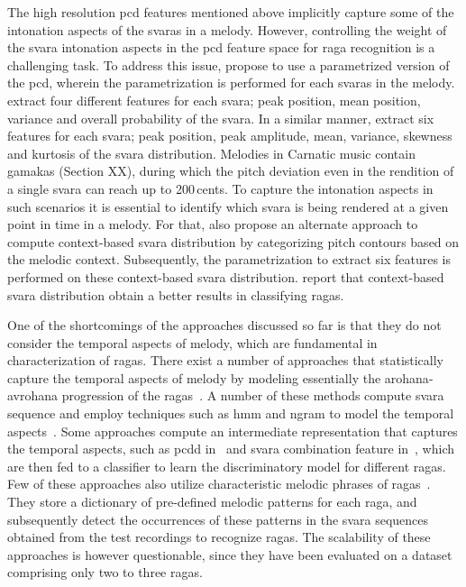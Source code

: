 {The high resolution \gls{pcd} features mentioned above implicitly capture some of the intonation aspects of the \glspl{svara} in a melody. However, controlling the weight of the \gls{svara} intonation aspects in the \gls{pcd} feature space for \gls{raga} recognition is a challenging task. To address this issue, \cite{belle2009raga,koduri2014intonation} propose to use a parametrized version of the \gls{pcd}, wherein the parametrization is performed for each \glspl{svara} in the melody. \cite{belle2009raga} extract four different features for each \gls{svara}; peak position, mean position, variance and overall probability of the \gls{svara}.  In a similar manner, \cite{koduri2014intonation} extract six features for each \gls{svara}; peak position, peak amplitude, mean, variance, skewness and kurtosis of the \gls{svara} distribution. Melodies in Carnatic music contain \glspl{gamaka} (Section XX), during which the pitch deviation even in the rendition of a single \gls{svara} can reach up to 200\,cents. To capture the intonation aspects in such scenarios it is essential to identify which \gls{svara} is being rendered at a given point in time in a melody. For that, \cite{koduri2014intonation} also propose an alternate approach to compute context-based \gls{svara} distribution by categorizing pitch contours based on the melodic context. Subsequently, the parametrization to extract six features is performed on these context-based \gls{svara} distribution. \cite{koduri2014intonation} report that context-based \gls{svara} distribution obtain a better results in classifying \glspl{raga}.

One of the shortcomings of the approaches discussed so far is that they do not consider the temporal aspects of melody, which are fundamental in characterization of \glspl{raga}. There exist a number of approaches that statistically capture the temporal aspects of melody by modeling essentially the \gls{arohana}-\gls{avrohana} progression of the \glspl{raga}~\citep{pandey2003tansen,chordia2007raag,Shetty2009,sridhar2009raga,dighe2013scale,kumar2014identifying}. A number of these methods compute \gls{svara} sequence and employ techniques such as \gls{hmm} and \gls{ngram} to model the temporal aspects~\citep{pandey2003tansen,dighe2013scale,kumar2014identifying}. Some approaches compute an intermediate representation that captures the temporal aspects, such as \gls{pcdd} in~\cite{Pchordia2007raag} and \gls{svara} combination feature in~\cite{Shetty2009}, which are then fed to a classifier to learn the discriminatory model for different \glspl{raga}. Few of these approaches also utilize characteristic melodic phrases of \glspl{raga}~\citep{pandey2003tansen,sridhar2009raga}. They store a dictionary of pre-defined melodic patterns for each \gls{raga}, and subsequently detect the occurrences of these patterns in the \gls{svara} sequences obtained from the test recordings to recognize \glspl{raga}. The scalability of these approaches is however questionable, since they have been evaluated on a dataset comprising only two to three \glspl{raga}. 

}
